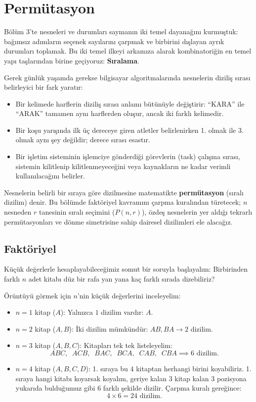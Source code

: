 \chapter[Permütasyon · \textit{Temel}]{Permütasyon}

Bölüm 3'te nesneleri ve durumları saymanın iki temel dayanağını kurmuştuk: bağımsız adımların seçenek sayılarını çarpmak ve birbirini dışlayan ayrık durumları toplamak. Bu iki temel ilkeyi arkamıza alarak kombinatoriğin en temel yapı taşlarından birine geçiyoruz: \textbf{Sıralama}.

Gerek günlük yaşamda gerekse bilgisayar algoritmalarında nesnelerin diziliş sırası belirleyici bir fark yaratır:
\begin{itemize}
  \item Bir kelimede harflerin diziliş sırası anlamı bütünüyle değiştirir: ``KARA'' ile ``ARAK'' tamamen aynı harflerden oluşur, ancak iki farklı kelimedir.
  \item Bir koşu yarışında ilk üç dereceye giren atletler belirlenirken 1. olmak ile 3. olmak aynı şey değildir; derece sırası esastır.
  \item Bir işletim sisteminin işlemciye gönderdiği görevlerin (task) çalışma sırası, sistemin kilitlenip kilitlenmeyeceğini veya kaynakların ne kadar verimli kullanılacağını belirler.
\end{itemize}

Nesnelerin belirli bir sıraya göre dizilmesine matematikte \textbf{permütasyon} (sıralı dizilim) denir. Bu bölümde faktöriyel kavramını çarpma kuralından türetecek; $n$ nesneden $r$ tanesinin sıralı seçimini ($P(n, r)$), özdeş nesnelerin yer aldığı tekrarlı permütasyonları ve dönme simetrisine sahip dairesel dizilimleri ele alacağız.

\section{Faktöriyel}

Küçük değerlerle hesaplayabileceğimiz somut bir soruyla başlayalım: Birbirinden farklı $n$ adet kitabı düz bir rafa yan yana kaç farklı sırada dizebiliriz?

Örüntüyü görmek için $n$'nin küçük değerlerini inceleyelim:
\begin{itemize}
  \item $n = 1$ kitap ($A$): Yalnızca $1$ dizilim vardır: $A$.
  \item $n = 2$ kitap ($A, B$): İki dizilim mümkündür: $AB, BA \to 2$ dizilim.
  \item $n = 3$ kitap ($A, B, C$): Kitapları tek tek listeleyelim:
  \[ ABC, \;\; ACB, \;\; BAC, \;\; BCA, \;\; CAB, \;\; CBA \implies 6 \text{ dizilim.} \]
  \item $n = 4$ kitap ($A, B, C, D$): 1. sıraya bu $4$ kitaptan herhangi birini koyabiliriz. 1. sıraya hangi kitabı koyarsak koyalım, geriye kalan $3$ kitap kalan $3$ pozisyona yukarıda bulduğumuz gibi $6$ farklı şekilde dizilir. Çarpma kuralı gereğince:
  \[ 4 \times 6 = 24 \text{ dizilim.} \]
\end{itemize}

